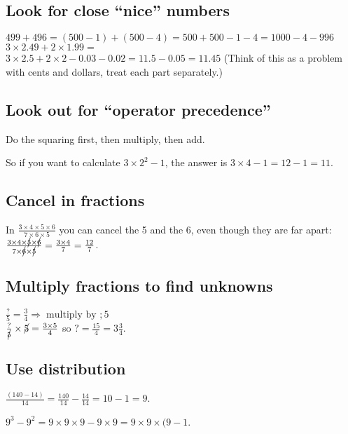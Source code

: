 \documentclass[fullpage,twocolumn]{article}
\begin{document}
\subsection{Look for close ``nice'' numbers}
$499 + 496 = (500 - 1) + (500 - 4 ) = 500 + 500 - 1 - 4 = 1000 - 4 - 996$\\

$3 \times 2.49 + 2 \times 1.99 =$ \\
$ 3 \times 2.5 + 2 \times 2 - 0.03 - 0.02 = 11.5 - 0.05 = 11.45$
(Think of this as a problem with cents and dollars, treat each part separately.)

\subsection{Look out for ``operator precedence''}

Do the squaring first, then multiply, then add.

So if you want to calculate $3 \times 2^2 - 1$,
the answer is $3\times  4 -  1 = 12 - 1 = 11$.

\subsection{Cancel in fractions}

In $\frac{3 \times 4 \times 5 \times 6}{7 \times 6 \times 5}$ you can cancel
the 5 and the 6, even though they are far apart: $\frac{3 \times 4 \times \cancel{5}
\times \cancel{6}}{ 7 \times  \cancel{6} \times \cancel{5}} = \frac{3 \times 4}{7} = \frac{12}{7}$.

\subsection{Multiply fractions to find unknowns}

$\frac{?}{5} = \frac{3}{4} \Rightarrow \; \mbox{multiply by } ; 5$\\
$\frac{?}{\cancel{5}} \times \cancel{5} = \frac{3 \times 5}{4}$ so  $? = \frac{15}{4} = 3\frac{3}{4}$.

\subsection{Use distribution}

$\frac{(140 - 14)}{14} = \frac{140}{14} - \frac{14}{14} = 10 - 1 = 9$.

$9^3 - 9^2 = 9 \times 9 \times 9 - 9 \times 9 = 9 \times 9 \times (9 - 1$.
\end{document}
